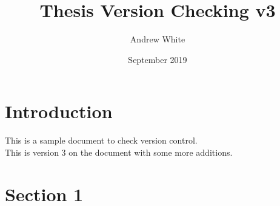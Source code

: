 \documentclass{article}
\title{Thesis Version Checking v3}
\author{Andrew White}
\date{September 2019}
\begin{document}
\maketitle

\section{Introduction}

This is a sample document to check version control.\\

This is version 3 on the document with some more additions.

\blindtext[3]

\section{Section 1}

\blindtext[3]
\end{document}
